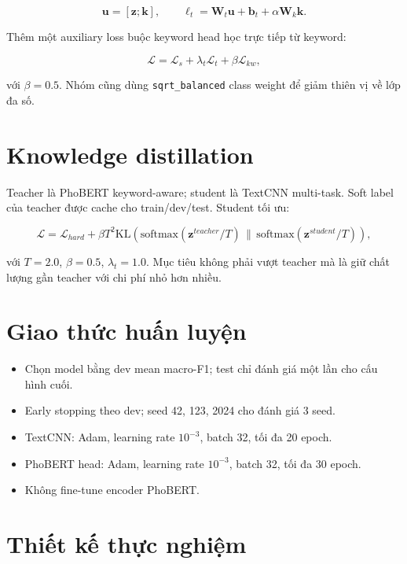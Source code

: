 \documentclass[12pt,a4paper]{report}
\begin{document}
\[
\mathbf{u} = [\mathbf{z}; \mathbf{k}], \qquad
\boldsymbol{\ell}_t = \mathbf{W}_t \mathbf{u} + \mathbf{b}_t + \alpha \mathbf{W}_k \mathbf{k}.
\]

Thêm một auxiliary loss buộc keyword head học trực tiếp từ keyword:

\begin{equation}
\mathcal{L} = \mathcal{L}_s + \lambda_t \mathcal{L}_t + \beta \mathcal{L}_{kw},
\end{equation}

với \(\beta=0.5\). Nhóm cũng dùng \texttt{sqrt\_balanced} class weight để giảm thiên vị về lớp đa số.

\section{Knowledge distillation}

Teacher là PhoBERT keyword-aware; student là TextCNN multi-task. Soft label của teacher được cache cho train/dev/test. Student tối ưu:

\begin{equation}
\mathcal{L} = \mathcal{L}_{hard} + \beta T^2
\mathrm{KL}\left(\mathrm{softmax}(\mathbf{z}^{teacher}/T) \,\|\, \mathrm{softmax}(\mathbf{z}^{student}/T)\right),
\end{equation}

với \(T=2.0\), \(\beta=0.5\), \(\lambda_t=1.0\). Mục tiêu không phải vượt teacher mà là giữ chất lượng gần teacher với chi phí nhỏ hơn nhiều.

\section{Giao thức huấn luyện}

\begin{itemize}[leftmargin=1.2cm]
  \item Chọn model bằng dev mean macro-F1; test chỉ đánh giá một lần cho cấu hình cuối.
  \item Early stopping theo dev; seed 42, 123, 2024 cho đánh giá 3 seed.
  \item TextCNN: Adam, learning rate \(10^{-3}\), batch 32, tối đa 20 epoch.
  \item PhoBERT head: Adam, learning rate \(10^{-3}\), batch 32, tối đa 30 epoch.
  \item Không fine-tune encoder PhoBERT.
\end{itemize}

\section{Thiết kế thực nghiệm}
\end{document}
